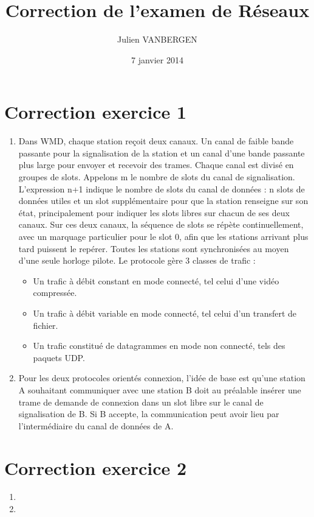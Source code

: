 \documentclass[a4paper, 11pt, titlepage]{article}
\title{Correction de l'examen de Réseaux}
\date{7 janvier 2014}
\author{Julien VANBERGEN}
\begin{document}
\maketitle

\section{Correction exercice 1}
\begin{enumerate}[label=(\alph*)]
\item
Dans WMD, chaque station reçoit deux canaux. Un canal de faible bande passante pour la signalisation de la station et un canal d'une bande passante plus large pour envoyer et recevoir des trames. Chaque canal est divisé en groupes de slots. Appelons m le nombre de slots du canal de signalisation. L'expression n+1 indique le nombre de slots du canal de données : n slots de données utiles et un slot supplémentaire pour que la station renseigne sur son état, principalement pour indiquer les slots libres sur chacun de ses deux canaux. Sur ces deux canaux, la séquence de slots se répète continuellement, avec un marquage particulier pour le slot 0, afin que les stations arrivant plus tard puissent le repérer. Toutes les stations sont synchronisées au moyen d'une seule horloge pilote.
Le protocole gère 3 classes de trafic : 
\begin{itemize}
\item Un trafic à débit constant en mode connecté, tel celui d'une vidéo compressée.
\item Un trafic à débit variable en mode connecté, tel celui d'un transfert de fichier.
\item Un trafic constitué de datagrammes en mode non connecté, tels des paquets UDP.
 \end{itemize}

\item 
Pour les deux protocoles orientés connexion, l'idée de base est qu'une station A souhaitant communiquer avec une station B doit au préalable insérer une trame de demande de connexion dans un slot libre sur le canal de signalisation de B. Si B accepte, la communication peut avoir lieu par l'intermédiaire du canal de données de A.


\end{enumerate}

\section{Correction exercice 2}
\begin{enumerate}[label=(\alph*)]
\item

\item 


\end{enumerate}
\end{document}
